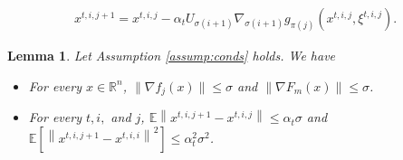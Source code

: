 \documentclass[10pt,a4paper]{amsart}
\newtheorem{lemma}{Lemma}
\newcommand{\Fm}{F_m}
\begin{document}
\begin{align}\label{eq:alg_update}
    x^{t,i,j+1} = x^{t,i,j} - \alpha_t U_{\sigma(i+1)} \nabla_{\sigma(i+1)} g_{\pi(j)} (x^{t,i,j}, \xi^{t,i,j}).
\end{align}

\begin{lemma}\label{lem:bounds}
Let Assumption \ref{assump:conds} holds. 
We have 
\begin{itemize}
\item[(a)] For every $x\in \mathbb{R}^n$, $\|\nabla f_j(x)\| \leq \sigma$ and $\|\nabla \Fm(x)\| \leq \sigma$.
\item[(b)] For every $t, i,$ and $j$, $\mathbb{E} \left\|x^{t,i,j+1}-x^{t,i,j}\right\| \leq \alpha_t \sigma $ and $\mathbb{E} \left[\left\|x^{t,i,j+1}-x^{t,i,i}\right\|^2\right] \leq \alpha^2_t \sigma^2$.
\end{itemize} 
\end{lemma}
\end{document}
